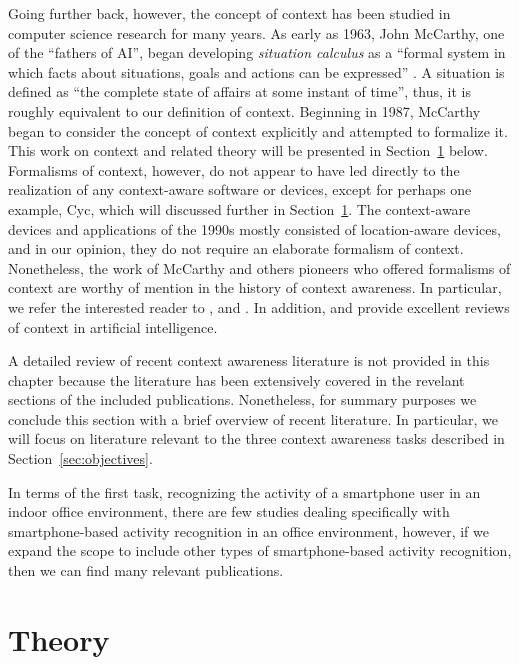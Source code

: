 Going further back, however, the concept of context has been studied in computer science research for many years. As early as 1963, John McCarthy, one of the ``fathers of AI'', began developing \emph{situation calculus} as a ``formal system in which facts about situations, goals and actions can be expressed'' \cite{mccarthy1963programs}. A situation is defined as ``the complete state of affairs at some instant of time'', thus, it is roughly equivalent to our definition of context. Beginning in 1987, McCarthy began to consider the concept of context explicitly and attempted to formalize it. This work on context and related theory will be presented in Section~\ref{sec:theory} below. Formalisms of context, however, do not appear to have led directly to the realization of any context-aware software or devices, except for perhaps one example, Cyc, which will discussed further in Section~\ref{sec:theory}. The context-aware devices and applications of the 1990s mostly consisted of location-aware devices, and in our opinion, they do not require an elaborate formalism of context. Nonetheless, the work of McCarthy and others pioneers who offered formalisms of context are worthy of mention in the history of context awareness. In particular, we refer the interested reader to \cite{McCarthy1993} \cite{guha1991contexts} \cite{mccarthy1997formalizing} \cite{akman1996steps}, and \cite{buvac1993propositional}. In addition, \cite{brezillon1999context} and \cite{akman2002context} provide excellent reviews of context in artificial intelligence.

A detailed review of recent context awareness literature is not provided in this chapter because the literature has been extensively covered in the revelant sections of the included publications. Nonetheless, for summary purposes we conclude this section with a brief overview of recent literature. In particular, we will focus on literature relevant to the three context awareness tasks described in Section~\ref{sec:objectives}.

In terms of the first task, recognizing the activity of a smartphone user in an indoor office environment, there are few studies dealing specifically with smartphone-based activity recognition in an office environment, however, if we expand the scope to include other types of smartphone-based activity recognition, then we can find many relevant publications.


\section{Theory}
\label{sec:theory}

